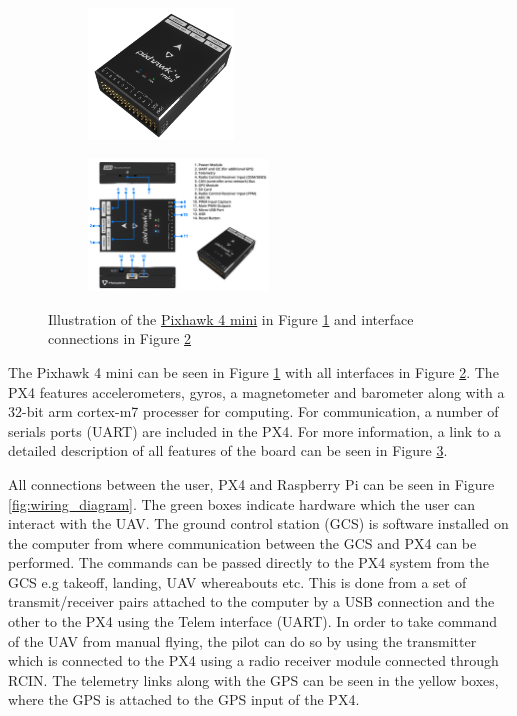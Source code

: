 \documentclass[../Head/report.tex]{subfiles}
\begin{document}
\begin{figure}[H]
    \centering
    \hspace{-6.0em}
    \begin{subfigure}[b]{.4\textwidth}
        \centering
        \includegraphics[height=3.5cm]{../Figures/px4_mini/px4_mini.png}
        \caption{}
        \label{fig:pixhawk_mini_four_board}
    \end{subfigure}
    \begin{subfigure}[b]{.33\textwidth}
        \centering
        \includegraphics[height=3.5cm]{../Figures/px4_mini/px4_mini_interfaces.png}
        \caption{}
        \label{fig:pixhawk_mini_four_interfaces}
    \end{subfigure}
    \caption{Illustration of the \href{https://docs.px4.io/master/en/flight_controller/pixhawk4_mini.html}{Pixhawk 4 mini} in Figure \ref{fig:pixhawk_mini_four_board} and interface connections in Figure \ref{fig:pixhawk_mini_four_interfaces}}
    \label{fig:pixhawk_mini_four}
\end{figure}

The Pixhawk 4 mini can be seen in Figure \ref{fig:pixhawk_mini_four_board} with all interfaces in Figure \ref{fig:pixhawk_mini_four_interfaces}. The PX4 features accelerometers, gyros, a magnetometer and barometer along with a 32-bit arm cortex-m7 processer for computing. For communication, a number of serials ports (UART) are included in the PX4. For more information, a link to a detailed description of all features of the board can be seen in Figure \ref{fig:pixhawk_mini_four}. 

All connections between the user, PX4 and Raspberry Pi can be seen in Figure \ref{fig:wiring_diagram}. The green boxes indicate hardware which the user can interact with the UAV. The ground control station (GCS) is software installed on the computer from where communication between the GCS and PX4 can be performed. The commands can be passed directly to the PX4 system from the GCS e.g takeoff, landing, UAV whereabouts etc. This is done from a set of transmit/receiver pairs attached to the computer by a USB connection and the other to the PX4 using the Telem interface (UART). In order to take command of the UAV from manual flying, the pilot can do so by using the transmitter which is connected to the PX4 using a radio receiver module connected through RCIN. The telemetry links along with the GPS can be seen in the yellow boxes, where the GPS is attached to the GPS input of the PX4. 
\end{document}
